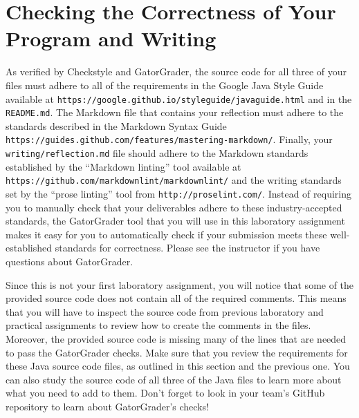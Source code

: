\documentclass[11pt]{article}
\newcommand{\reflection}{\lstinline{writing/reflection.md}}
\newcommand{\readme}{\lstinline{README.md}}
\newcommand{\url}[1]{\lstinline{#1}}
\newcommand{\step}[1]{``{#1}''}
\begin{document}
\section*{Checking the Correctness of Your Program and Writing}

As verified by Checkstyle and GatorGrader, the source code for all three of your files must adhere to all of the
requirements in the Google Java Style Guide available at \url{https://google.github.io/styleguide/javaguide.html} and in
the \readme{}. The Markdown file that contains your reflection must adhere to the standards described in the Markdown
Syntax Guide \url{https://guides.github.com/features/mastering-markdown/}. Finally, your \reflection{} file should
adhere to the Markdown standards established by the \step{Markdown linting} tool available at
\url{https://github.com/markdownlint/markdownlint/} and the writing standards set by the \step{prose linting} tool from
\url{http://proselint.com/}. Instead of requiring you to manually check that your deliverables adhere to these
industry-accepted standards, the GatorGrader tool that you will use in this laboratory assignment makes it easy for you
to automatically check if your submission meets these well-established standards for correctness. Please see the
instructor if you have questions about GatorGrader.

Since this is not your first laboratory assignment, you will notice that some of the provided source code does not
contain all of the required comments. This means that you will have to inspect the source code from previous laboratory
and practical assignments to review how to create the comments in the files. Moreover, the provided source code is
missing many of the lines that are needed to pass the GatorGrader checks. Make sure that you review the requirements for
these Java source code files, as outlined in this section and the previous one. You can also study the source code of
all three of the Java files to learn more about what you need to add to them. Don't forget to look in your team's GitHub
repository to learn about GatorGrader's checks!
\end{document}
